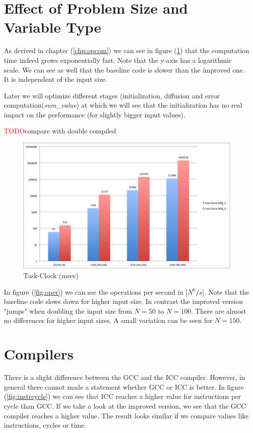 \documentclass[12pt,a4paper]{article}
\begin{document}
\section{Effect of Problem Size and Variable Type}

As derived in chapter (\ref{chp:opcom}) we can see in figure (\ref{fig:clock}) that the computation time indeed grows exponentially fast. Note that the y-axis has a logarithmic scale. We can see as well that the baseline code is slower than the improved one. It is independent of the input size.

Later we will optimize different stages (initialization, diffusion and error computation(\emph{sum\_value}) at which we will see that the initialization has no real impact on the performance (for slightly bigger input values). 

\textcolor{red}{TODO}compare with double compiled

\begin{figure}[h]
	\centering
	\includegraphics[width=1.0\linewidth]{"Benchmark 2/clock"}
	\caption{Task-Clock (msec)}
	\label{fig:clock}
\end{figure}

In figure (\ref{fig:oper}) we can see the operations per second in [$N^6/s$]. Note that the baseline code slows down for higher input size. In contrast the improved version "jumps" when doubling the input size from $N=50$ to $N=100$. There are almost no differences for higher input sizes. A small variation can be seen for $N=150$.

\section{Compilers}

There is a slight difference between the GCC and the ICC compiler. However, in general there cannot made a statement whether GCC or ICC is better. In figure (\ref{fig:instrcycle}) we can see that ICC reaches a higher value for instructions per cycle than GCC. If we take a look at the improved version, we see that the GCC compiler reaches a higher value. The result looks similar if we compare values like instructions, cycles or time.
\end{document}
